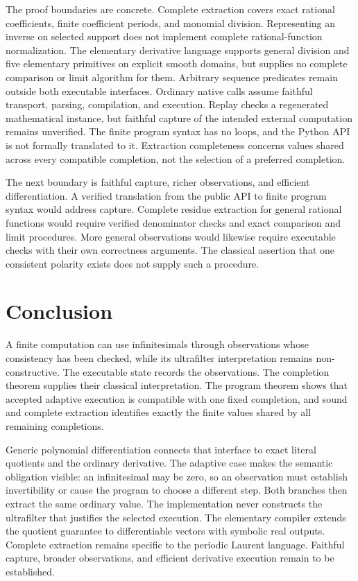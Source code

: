 \documentclass[11pt,a4paper]{article}
\theoremstyle{result}
\theoremstyle{definition}
\begin{document}
The proof boundaries are concrete. Complete extraction covers exact rational coefficients, finite coefficient periods, and monomial division. Representing an inverse on selected support does not implement complete rational-function normalization. The elementary derivative language supports general division and five elementary primitives on explicit smooth domains, but supplies no complete comparison or limit algorithm for them. Arbitrary sequence predicates remain outside both executable interfaces. Ordinary native calls assume faithful transport, parsing, compilation, and execution. Replay checks a regenerated mathematical instance, but faithful capture of the intended external computation remains unverified. The finite program syntax has no loops, and the Python API is not formally translated to it. Extraction completeness concerns values shared across every compatible completion, not the selection of a preferred completion.

The next boundary is faithful capture, richer observations, and efficient differentiation. A verified translation from the public API to finite program syntax would address capture. Complete residue extraction for general rational functions would require verified denominator checks and exact comparison and limit procedures. More general observations would likewise require executable checks with their own correctness arguments. The classical assertion that one consistent polarity exists does not supply such a procedure.

\section{Conclusion}

A finite computation can use infinitesimals through observations whose consistency has been checked, while its ultrafilter interpretation remains non-constructive. The executable state records the observations. The completion theorem supplies their classical interpretation. The program theorem shows that accepted adaptive execution is compatible with one fixed completion, and sound and complete extraction identifies exactly the finite values shared by all remaining completions.

Generic polynomial differentiation connects that interface to exact literal quotients and the ordinary derivative. The adaptive case makes the semantic obligation visible: an infinitesimal may be zero, so an observation must establish invertibility or cause the program to choose a different step. Both branches then extract the same ordinary value. The implementation never constructs the ultrafilter that justifies the selected execution. The elementary compiler extends the quotient guarantee to differentiable vectors with symbolic real outputs. Complete extraction remains specific to the periodic Laurent language. Faithful capture, broader observations, and efficient derivative execution remain to be established.
\end{document}
